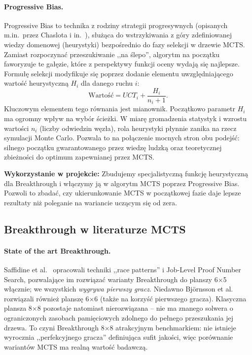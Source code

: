 \paragraph{Progressive Bias.}
Progressive Bias to technika z rodziny strategii progresywnych (opisanych m.in.\
przez Chaslota i in.~\cite{chaslot2008progressive}), służąca do wstrzykiwania
z góry zdefiniowanej wiedzy domenowej (heurystyki) bezpośrednio do fazy selekcji
w drzewie MCTS. Zamiast rozpoczynać przeszukiwanie ,,na ślepo'', algorytm na
początku faworyzuje te gałęzie, które z perspektywy funkcji oceny wydają się
najlepsze. Formułę selekcji modyfikuje się poprzez dodanie elementu
uwzględniającego wartość heurystyczną $H_i$ dla danego ruchu $i$:
\begin{equation}
    \text{Wartość} = UCT_i + \frac{H_i}{n_i + 1}.
\end{equation}
Kluczowym elementem tego równania jest mianownik. Początkowo parametr $H_i$ ma
ogromny wpływ na wybór ścieżki. W miarę gromadzenia statystyk i wzrostu wartości
$n_i$ (liczby odwiedzin węzła), rola heurystyki płynnie zanika na rzecz symulacji
Monte Carlo. Pozwala to na połączenie mocnych stron obu podejść: silnego początku
gwarantowanego przez wiedzę ludzką oraz teoretycznej zbieżności do optimum
zapewnianej przez MCTS.

\textbf{Wykorzystanie w projekcie:} Zbudujemy specjalistyczną funkcję heurystyczną
dla Breakthrough i włączymy ją w algorytm MCTS poprzez Progressive Bias. Pozwoli
to zbadać, czy ukierunkowanie MCTS w początkowej fazie daje lepsze rezultaty niż
poleganie na wariancie uczącym się od zera.

\subsection{Breakthrough w literaturze MCTS}

\paragraph{State of the art Breakthrough.}
Saffidine et al.~\cite{saffidine2011solving} opracowali techniki ,,race
patterns'' i Job-Level Proof Number Search, pozwalające im rozwiązać
warianty Breakthrough do planszy 6$\times$5 włącznie; we wszystkich
\emph{wygrywa pierwszy gracz}. Niedawno Björnsson et al.~\cite{bjornsson2026solving}
rozwiązali również planszę 6$\times$6 (także na korzyść pierwszego gracza).
Klasyczna plansza 8$\times$8 pozostaje natomiast nierozwiązana -- nie ma
znanego solwera o ograniczonych zasobach pamięciowych zdolnego do pełnego
przeszukania jej drzewa. To czyni Breakthrough 8$\times$8 atrakcyjnym
benchmarkiem: nie istnieje wyrocznia ,,perfekcyjnego gracza'' definiująca
sufit jakości, więc porównanie wariantów MCTS ma realną wartość badawczą.

